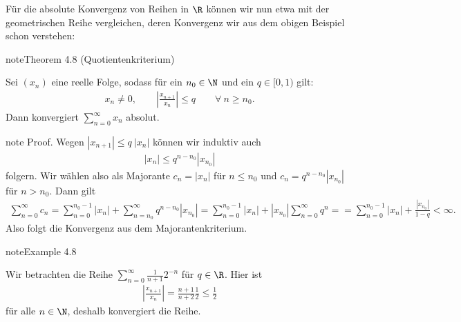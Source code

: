 \documentclass[letterpaper,10pt,english]{jupyterBook}
\begin{document}
Für die absolute Konvergenz von Reihen in \(\R\) können wir nun etwa mit der geometrischen Reihe vergleichen, deren Konvergenz wir aus dem obigen Beispiel schon verstehen:
\label{metrik/reihen:theorem-7}
\begin{sphinxadmonition}{note}{Theorem 4.8 (Quotientenkriterium)}



Sei \((x_n)\) eine reelle Folge, sodass für ein \(n_0 \in \N\) und ein \(q \in [0,1)\) gilt:
\begin{equation*}
\begin{split}x_n \neq 0,\qquad \left\vert \frac{x_{n+1}}{x_n} \right\vert \leq q \qquad \forall~n \geq n_0.\end{split}
\end{equation*}
Dann konvergiert \(\sum_{n=0}^\infty x_n\) absolut.
\end{sphinxadmonition}

\begin{sphinxadmonition}{note}
Proof.  Wegen \(|x_{n+1}| \leq q~|x_n|\) können wir induktiv auch
\begin{equation*}
\begin{split}|x_n| \leq q^{n-n_0} |x_{n_0}|\end{split}
\end{equation*}
folgern. Wir wählen also als Majorante \(c_n= |x_n|\) für \(n \leq n_0\) und \(c_n = q^{n-n_0} |x_{n_0}|\) für
\(n > n_0.\) Dann gilt
\begin{equation*}
\begin{split} \sum_{n=0}^\infty c_n = \sum_{n=0}^{n_0-1} |x_n| + \sum_{n=n_0}^\infty q^{n-n_0} |x_{n_0}| =\sum_{n=0}^{n_0-1} |x_n| +  |x_{n_0}| \sum_{n=0}^\infty q^{n} = =\sum_{n=0}^{n_0-1} |x_n| +  \frac{|x_{n_0}|}{1-q} < \infty.\end{split}
\end{equation*}
Also folgt die Konvergenz aus dem Majorantenkriterium.
\end{sphinxadmonition}
\label{metrik/reihen:example-8}
\begin{sphinxadmonition}{note}{Example 4.8}



Wir betrachten die Reihe \(\sum_{n=0}^\infty \frac{1}{n+1} 2^{-n}\) für \(q \in \R\). Hier ist
\begin{equation*}
\begin{split}  \left\vert \frac{x_{n+1}}{x_n} \right\vert  = \frac{n+1}{n+2} \frac{1}2 \leq \frac{1}2\end{split}
\end{equation*}
für alle \(n \in \N\), deshalb konvergiert die Reihe.
\end{sphinxadmonition}
\end{document}
